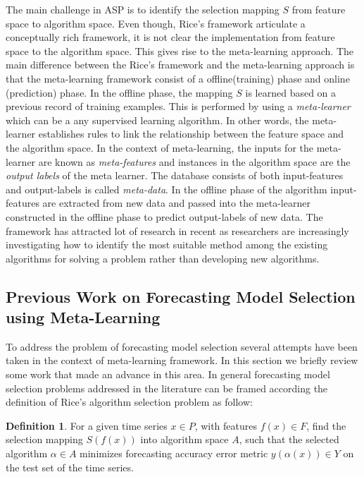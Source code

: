 \documentclass[11pt,a4paper,]{article}
\theoremstyle{definition}
\newtheorem{definition}{Definition}[section]
\theoremstyle{definition}
\theoremstyle{definition}
\theoremstyle{remark}
\begin{document}
The main challenge in ASP is to identify the selection mapping \(S\)
from feature space to algorithm space. Even though, Rice's framework
articulate a conceptually rich framework, it is not clear the
implementation from feature space to the algorithm space. This gives
rise to the meta-learning approach. The main difference between the
Rice's framework and the meta-learning approach is that the
meta-learning framework consist of a offline(training) phase and online
(prediction) phase. In the offline phase, the mapping \(S\) is learned
based on a previous record of training examples. This is performed by
using a \emph{meta-learner} which can be a any supervised learning
algorithm. In other words, the meta-learner establishes rules to link
the relationship between the feature space and the algorithm space. In
the context of meta-learning, the inputs for the meta-learner are known
as \emph{meta-features} and instances in the algorithm space are the
\emph{output labels} of the meta learner. The database consists of both
input-features and output-labels is called \emph{meta-data}. In the
offline phase of the algorithm input-features are extracted from new
data and passed into the meta-learner constructed in the offline phase
to predict output-labels of new data. The framework has attracted lot of
research in recent as researchers are increasingly investigating how to
identify the most suitable method among the existing algorithms for
solving a problem rather than developing new algorithms.

\subsection{Previous Work on Forecasting Model Selection using
Meta-Learning}\label{previous-work-on-forecasting-model-selection-using-meta-learning}

To address the problem of forecasting model selection several attempts
have been taken in the context of meta-learning framework. In this
section we briefly review some work that made an advance in this area.
In general forecasting model selection problems addressed in the
literature can be framed according the definition of Rice's algorithm
selection problem as follow:

\begin{definition}
\label{def2}
For a given time series $x \in P$, with features $f(x) \in F$, find the selection mapping $S(f(x))$ into algorithm space $A$, such that the selected algorithm $\alpha \in A$ minimizes forecasting accuracy error metric $y(\alpha(x)) \in Y$ on the test set of the time series.
\end{definition}
\end{document}

